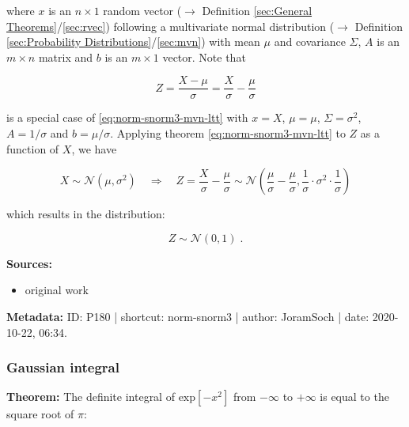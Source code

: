 \documentclass[a4paper,12pt,twoside]{book}
\begin{document}
where $x$ is an $n \times 1$ random vector ($\rightarrow$ Definition \ref{sec:General Theorems}/\ref{sec:rvec}) following a multivariate normal distribution ($\rightarrow$ Definition \ref{sec:Probability Distributions}/\ref{sec:mvn}) with mean $\mu$ and covariance $\Sigma$, $A$ is an $m \times n$ matrix and $b$ is an $m \times 1$ vector. Note that

\begin{equation} \label{eq:norm-snorm3-Z-X}
Z = \frac{X-\mu}{\sigma} = \frac{X}{\sigma} - \frac{\mu}{\sigma}
\end{equation}

is a special case of \eqref{eq:norm-snorm3-mvn-ltt} with $x = X$, $\mu = \mu$, $\Sigma = \sigma^2$, $A = 1/\sigma$ and $b = \mu/\sigma$. Applying theorem \eqref{eq:norm-snorm3-mvn-ltt} to $Z$ as a function of $X$, we have

\begin{equation} \label{eq:norm-snorm3-mvn-ltt-norm}
X \sim \mathcal{N}(\mu, \sigma^2) \quad \Rightarrow \quad Z = \frac{X}{\sigma} - \frac{\mu}{\sigma} \sim \mathcal{N}\left( \frac{\mu}{\sigma} - \frac{\mu}{\sigma}, \frac{1}{\sigma} \cdot \sigma^2 \cdot \frac{1}{\sigma} \right)
\end{equation}

which results in the distribution:

\begin{equation} \label{eq:norm-snorm3-Z-snorm-qed}
Z \sim \mathcal{N}(0, 1) \; .
\end{equation}


\vspace{1em}
\textbf{Sources:}
\begin{itemize}
\item original work\end{itemize}


\vspace{1em}
\textbf{Metadata:} ID: P180 | shortcut: norm-snorm3 | author: JoramSoch | date: 2020-10-22, 06:34.
\vspace{1em}



\subsubsection[\textbf{Gaussian integral}]{Gaussian integral} \label{sec:norm-gi}
\setcounter{equation}{0}

\textbf{Theorem:} The definite integral of $\mathrm{exp}\left[ -x^2 \right]$ from $-\infty$ to $+\infty$ is equal to the square root of $\pi$:
\end{document}
